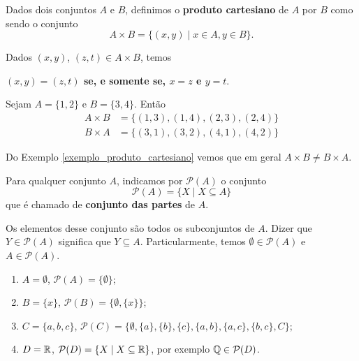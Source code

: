 \begin{definicao}
	Dados dois conjuntos $A$ e $B$, definimos o \textbf{produto cartesiano} de $A$ por $B$ como sendo o conjunto
	\[
		A \times B = \{(x,y) \mid x\in A, y\in B\}.
	\]
\end{definicao}

Dados $(x,y)$, $(z,t) \in A\times B$, temos
\begin{center}
	\textbf{$(x,y) = (z,t)$ se, e somente se, $x = z$ e $y = t$}.
\end{center}

\begin{exemplo}\label{exemplo_produto_cartesiano}
	Sejam $A = \{1,2\}$ e $B = \{3,4\}$. Ent\~ao
	\begin{align*}
		A \times B &= \{(1,3), (1,4), (2,3), (2,4)\}\\
		B \times A &= \{(3,1), (3,2), (4,1), (4,2)\}
\end{align*}
\end{exemplo}

\begin{observacao}
	Do Exemplo \eqref{exemplo_produto_cartesiano} vemos que em geral $A \times B \neq B\times A$.
\end{observacao}

\begin{definicao}
	Para qualquer conjunto $A$, indicamos por $\mathcal{P}(A)$ o conjunto
	\[
		\mathcal{P}(A) = \{ X \mid X\subseteq A\}
	\]
	que \'e chamado de \textbf{conjunto das partes} de $A$.
\end{definicao}

Os elementos desse conjunto s{\~a}o todos os subconjuntos de $A$. Dizer que $Y\in \mathcal{P}(A)$ significa que $Y \subseteq A$. Particularmente, temos $\emptyset\in \mathcal{P}(A)$ e $A\in \mathcal{P}(A)$.

\begin{exemplos}
	\begin{enumerate}[label={\arabic*})]
		\item $A = \emptyset$, $\mathcal{P}(A) = \{\emptyset\}$;
		\item $B = \{x\}$, $\mathcal{P}(B) = \{\emptyset, \{x\}\}$;
		\item $C = \{a,b,c\}$, $\mathcal{P}(C)=\{\emptyset, \{a\}, \{b\},\{c\},\{a,b\},\{a,c\},\{b,c\},C\}$;
		\item $D=\mathbb{R}$, $\mathcal{P}(D)=\{X\mid X \subseteq \mathbb{R}\}$, por exemplo $\mathbb{Q}\in \mathcal{P}(D)$.
	\end{enumerate}	
\end{exemplos}